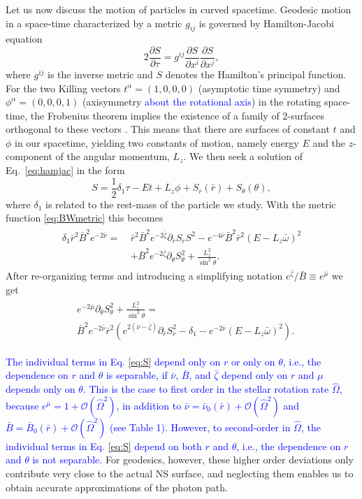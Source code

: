 \documentclass{aa}
\newcommand{\be}{\begin{equation}}
\newcommand{\ee}{\end{equation}}
\newcommand{\refe}[1]{\textcolor{blue}{{#1}}}
\newcommand{\pd}{\ensuremath{\partial}} %
\newcommand{\rb}{\ensuremath{\bar{r}}}
\newcommand{\wb}{\ensuremath{\bar{\omega}}}
\newcommand{\Ob}{\ensuremath{\hat{\Omega}}}
\newcommand{\nub}{\ensuremath{\bar{\nu}}}
\newcommand{\zetab}{\ensuremath{\bar{\zeta}}}
\newcommand{\Bb}{\ensuremath{\bar{B}}}
\newcommand{\mub}{\ensuremath{\bar{\mu}}}
\begin{document}
Let us now discuss the motion of particles in curved spacetime.
Geodesic motion in a space-time characterized by a metric $g_{ij}$ is governed by Hamilton-Jacobi equation
\be\label{eq:hamjac}
2\frac{\pd S}{\pd \tau} = g^{ij} \frac{\pd S}{\pd x^i}\frac{\pd S}{\pd x^j},
\ee
where $g^{ij}$ is the inverse metric and $S$ denotes the Hamilton's principal function.
For the two Killing vectors $t^{\alpha} = (1,0,0,0)$ (asymptotic time symmetry) and $\phi^{\alpha} = (0,0,0,1)$ (axisymmetry \refe{about the rotational axis}) in the rotating space-time, the Frobenius theorem implies the existence of a family of 2-surfaces orthogonal to these vectors \citep[see e.g.,][p.12]{rcs}.  
This means that there are surfaces of constant $t$ and $\phi$ in our spacetime, yielding two constants of motion, namely energy $E$ and the $z$-component of the angular momentum, $L_z$.  
We then seek a solution of Eq.~\eqref{eq:hamjac} in the form
\be
S = \frac{1}{2}\delta_1 \tau - Et + L_z\phi + S_{\rb}(\rb) + S_{\theta}(\theta),
\ee
where $\delta_1$ is related to the rest-mass of the particle we study.
With the metric function \eqref{eq:BWmetric} this becomes
\begin{align}\begin{split} 
    \delta_1 \rb^2 \Bb^2 e^{-2\nub} =~& \rb^2 \Bb^2 e^{-2\zetab} \pd_{\rb}S_{\rb}S^2 - e^{-4\nub} \Bb^2 \rb^2 (E - L_z \wb)^2 \\
                                & + \Bb^2 e^{-2\zetab} \pd_{\theta}S_{\theta}^2 + \frac{L_z^2}{\sin^2\theta}.
\end{split}\end{align}
After re-organizing terms and introducing a simplifying notation $e^{\zetab}/\Bb \equiv e^{\mub}$ we get
\begin{align}\begin{split}\label{eq:S}
& e^{-2\mub}\pd_{\theta}S_{\theta}^2 + \frac{L_z^2}{\sin^2\theta} = \\ 
& \Bb^2 e^{-2\nub}\rb^2 ( e^{2(\nub-\zetab)} \pd_{\rb}S_{\rb}^2 -\delta_{1} - e^{-2\nub}(E - L_z \wb)^2 ).
\end{split}\end{align}

\refe{The individual terms in Eq. \eqref{eq:S} depend only on $r$ or only on $\theta$, i.e., the dependence on $r$ and $\theta$ is separable, if $\nub$, $\Bb$, and $\zetab$ depend only on $r$ and $\mu$ depends only on $\theta$. 
This is the case to first order in the stellar rotation rate $\Ob$, because $e^{\mub} = 1 + \mathcal{O}(\Ob^2)$, in addition to $\nub = \nub_0(\rb) + \mathcal{O}(\Ob^2)$ and $\Bb = \Bb_0(\rb) + \mathcal{O}(\Ob^2)$ (see Table 1). 
However, to second-order in $\Ob$, the individual terms in Eq. \eqref{eq:S} depend on both $r$ and $\theta$, i.e., the dependence on $r$ and $\theta$ is not separable.}
For geodesics, however, these higher order deviations only contribute very close to the actual NS surface, and neglecting them enables us to obtain accurate approximations of the photon path.
\end{document}
